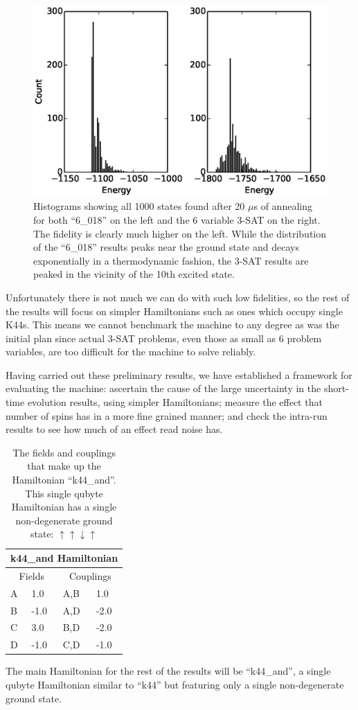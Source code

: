 \begin{figure}
	\includegraphics{img/hist.eps}
	\caption[20 $\mu$s Result State Histograms]{Histograms showing all 1000 states found after 20 $\mu$s of annealing for both ``6\_018'' on the left and the 6 variable 3-SAT on the right.  The fidelity is clearly much higher on the left.  While the distribution of the ``6\_018'' results peaks near the ground state and decays exponentially in a thermodynamic fashion, the 3-SAT results are peaked in the vicinity of the 10th excited state.}
	\label{fig:test_6_hist}
\end{figure}

Unfortunately there is not much we can do with such low fidelities, so the rest of the results will focus on simpler Hamiltonians such as ones which occupy single K44s.  This means we cannot benchmark the \machine machine to any degree as was the initial plan since actual 3-SAT problems, even those as small as 6 problem variables, are too difficult for the machine to solve reliably.

Having carried out these preliminary results, we have established a framework for evaluating the \machine machine: ascertain the cause of the large uncertainty in the short-time evolution results, using simpler Hamiltonians; measure the effect that number of spins has in a more fine grained manner; and check the intra-run results to see how much of an effect read noise has.
\begin{table}
	\begin{center}
\begin{tabular}{ | l | l | l | l |}
	\hline
	\multicolumn{4}{|c|}{k44\_and Hamiltonian} \\ \hline
	\multicolumn{2}{|c|}{Fields} & \multicolumn{2}{c|}{Couplings} \\ \hline
	A & 1.0 & A,B & 1.0 \\
	B & -1.0 & A,D & -2.0 \\
	C & 3.0 & B,D & -2.0 \\
	D & -1.0 & C,D & -1.0 \\ \hline
\end{tabular}
\end{center}
\caption[k44\_and Hamiltonian]{The fields and couplings that make up the Hamiltonian ``k44\_and''.  This single qubyte Hamiltonian has a single non-degenerate ground state: $\uparrow\uparrow\downarrow\uparrow$ }
\end{table}

The main Hamiltonian for the rest of the results will be ``k44\_and'', a single qubyte Hamiltonian similar to ``k44'' but featuring only a single non-degenerate ground state.
